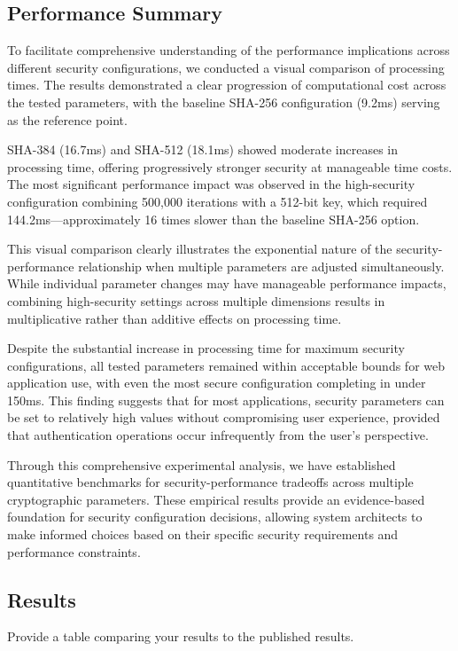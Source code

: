 \documentclass[11pt,a4paper]{article}
\begin{document}
\subsection{Performance Summary}
To facilitate comprehensive understanding of the performance implications across different security configurations, we conducted a visual comparison of processing times. The results demonstrated a clear progression of computational cost across the tested parameters, with the baseline SHA-256 configuration (9.2ms) serving as the reference point.

SHA-384 (16.7ms) and SHA-512 (18.1ms) showed moderate increases in processing time, offering progressively stronger security at manageable time costs. The most significant performance impact was observed in the high-security configuration combining 500,000 iterations with a 512-bit key, which required 144.2ms—approximately 16 times slower than the baseline SHA-256 option.

This visual comparison clearly illustrates the exponential nature of the security-performance relationship when multiple parameters are adjusted simultaneously. While individual parameter changes may have manageable performance impacts, combining high-security settings across multiple dimensions results in multiplicative rather than additive effects on processing time.

Despite the substantial increase in processing time for maximum security configurations, all tested parameters remained within acceptable bounds for web application use, with even the most secure configuration completing in under 150ms. This finding suggests that for most applications, security parameters can be set to relatively high values without compromising user experience, provided that authentication operations occur infrequently from the user's perspective.

Through this comprehensive experimental analysis, we have established quantitative benchmarks for security-performance tradeoffs across multiple cryptographic parameters. These empirical results provide an evidence-based foundation for security configuration decisions, allowing system architects to make informed choices based on their specific security requirements and performance constraints.


\subsection{Results}
Provide a table comparing your results to the published results.
\end{document}
